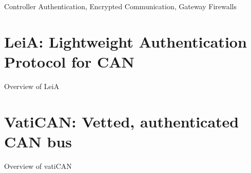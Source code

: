 Controller Authentication, Encrypted Communication, Gateway
Firewalls \cite{Lemke2006}


\section{LeiA: Lightweight Authentication Protocol for CAN}
\label{sec:leia}

Overview of LeiA \cite{Radu2016}


\section{VatiCAN: Vetted, authenticated CAN bus}
\label{sec:vatican}

Overview of vatiCAN \cite{Nurnberger2016}

